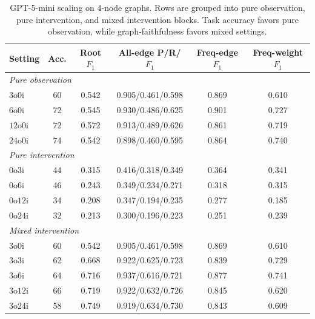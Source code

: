 \begin{table}[!ht]
\centering
\small
\setlength{\tabcolsep}{4pt}
\begin{tabular}{lccccc}
\toprule
Setting & Acc. & Root \(F_1\) & All-edge P/R/\(F_1\) & Freq-edge \(F_1\) & Freq-weight \(F_1\) \\
\midrule
\multicolumn{6}{l}{\textit{Pure observation}} \\
\(3\mathrm{o}0\mathrm{i}\) & 60 & 0.542 & 0.905/0.461/0.598 & 0.869 & 0.610 \\
\(6\mathrm{o}0\mathrm{i}\) & 72 & 0.545 & 0.930/0.486/0.625 & 0.901 & 0.727 \\
\(12\mathrm{o}0\mathrm{i}\) & 72 & 0.572 & 0.913/0.489/0.626 & 0.861 & 0.719 \\
\(24\mathrm{o}0\mathrm{i}\) & 74 & 0.542 & 0.898/0.460/0.595 & 0.864 & 0.740 \\
\midrule
\multicolumn{6}{l}{\textit{Pure intervention}} \\
\(0\mathrm{o}3\mathrm{i}\) & 44 & 0.315 & 0.416/0.318/0.349 & 0.364 & 0.341 \\
\(0\mathrm{o}6\mathrm{i}\) & 46 & 0.243 & 0.349/0.234/0.271 & 0.318 & 0.315 \\
\(0\mathrm{o}12\mathrm{i}\) & 34 & 0.208 & 0.347/0.194/0.235 & 0.277 & 0.185 \\
\(0\mathrm{o}24\mathrm{i}\) & 32 & 0.213 & 0.300/0.196/0.223 & 0.251 & 0.239 \\
\midrule
\multicolumn{6}{l}{\textit{Mixed intervention}} \\
\(3\mathrm{o}0\mathrm{i}\) & 60 & 0.542 & 0.905/0.461/0.598 & 0.869 & 0.610 \\
\(3\mathrm{o}3\mathrm{i}\) & 62 & 0.668 & 0.922/0.625/0.723 & 0.839 & 0.729 \\
\(3\mathrm{o}6\mathrm{i}\) & 64 & 0.716 & 0.937/0.616/0.721 & 0.877 & 0.741 \\
\(3\mathrm{o}12\mathrm{i}\) & 66 & 0.719 & 0.922/0.632/0.726 & 0.845 & 0.620 \\
\(3\mathrm{o}24\mathrm{i}\) & 58 & 0.749 & 0.919/0.634/0.730 & 0.843 & 0.609 \\
\bottomrule
\end{tabular}
\caption{GPT-5-mini scaling on 4-node graphs. Rows are grouped into pure observation, pure intervention, and mixed intervention blocks. Task accuracy favors pure observation, while graph-faithfulness favors mixed settings.}
\label{tab:scaling_mini_4nodes_metrics}
\end{table}


